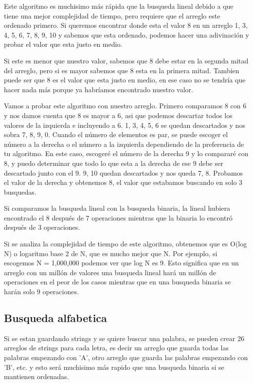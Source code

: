 \documentclass{article}
\begin{document}
Este algoritmo es muchisimo más rápida que la busqueda lineal debido a que tiene una mejor complejidad de tiempo, pero requiere que el arreglo este ordenado primero. Si queremos encontrar donde esta el valor 8 en un arreglo {1, 3, 4, 5, 6, 7, 8, 9, 10} y sabemos que esta ordenado, podemos hacer una adivinación y probar el valor que esta justo en medio.

Si este es menor que nuestro valor, sabemos que 8 debe estar en la segunda mitad del arreglo, pero si es mayor sabemos que 8 esta en la primera mitad. Tambien puede ser que 8 es el valor que esta justo en medio, en ese caso no se tendría que hacer nada más porque ya habríamos encontrado nuestro valor.

Vamos a probar este algoritmo con nuestro arreglo. Primero comparamos 8 con 6 y nos damos cuenta que 8 es mayor a 6, asi que podemos descartar todos los valores de la izquierda e incluyendo a 6. {1, 3, 4, 5, 6} se quedan descartados y nos sobra {7, 8, 9,  0}. Cuando el número de elementos es par, se puede escoger el número a la derecha o el número a la izquierda dependiendo de la preferencia de tu algoritmo. En este caso, escogeré el número de la derecha 9 y lo compararé con 8, y puedo determinar que todo lo que esta a la derecha de ese 9 debe ser descartado junto con el 9. {9, 10} quedan descartados y nos queda {7, 8}. Probamos el valor de la derecha y obtenemos 8, el valor que estabamos buscando en solo 3 busquedas.

Si comparamos la busqueda lineal con la busqueda binaria, la lineal hubiera encontrado el 8 después de 7 operaciones mientras que la binaria lo encontró después de 3 operaciones.

Si se analiza la complejidad de tiempo de este algoritmo, obtenemos que es O(log N) o logaritmo base 2 de N, que es mucho mejor que N. Por ejemplo, si escogemos N = 1,000,000 podemos ver que log N es 9. Esto significa que en un arreglo con un millón de valores una busqueda lineal hará un millón de operaciones en el peor de los casos mientras que en una busqueda binaria se harán solo 9 operaciones. 

\subsection{Busqueda alfabetica}

Si se estan guardando strings y se quiere buscar una palabra, se pueden crear 26 arreglos de strings para cada letra, es decir un arreglo que guarda todas las palabras empezando con 'A', otro arreglo que guarda las palabras empezando con 'B', etc. y esto será muchisimo más rapido que una busqueda binaria si se mantienen ordenadas.
\end{document}

